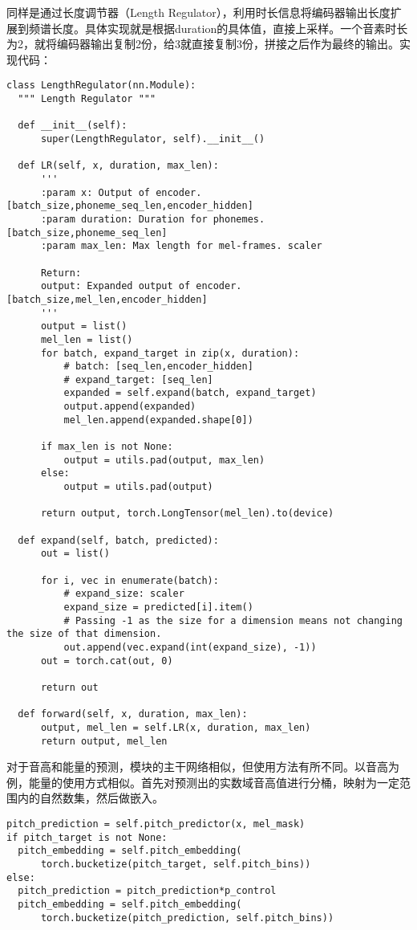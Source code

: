\documentclass[cn,10pt,math=newtx,citestyle=gb7714-2015,bibstyle=gb7714-2015]{elegantbook}
\begin{document}
同样是通过长度调节器（Length Regulator），利用时长信息将编码器输出长度扩展到频谱长度。具体实现就是根据duration的具体值，直接上采样。一个音素时长为2，就将编码器输出复制2份，给3就直接复制3份，拼接之后作为最终的输出。实现代码：

\begin{lstlisting}
class LengthRegulator(nn.Module):
  """ Length Regulator """

  def __init__(self):
      super(LengthRegulator, self).__init__()

  def LR(self, x, duration, max_len):
      '''
      :param x: Output of encoder. [batch_size,phoneme_seq_len,encoder_hidden]
      :param duration: Duration for phonemes. [batch_size,phoneme_seq_len]
      :param max_len: Max length for mel-frames. scaler

      Return:
      output: Expanded output of encoder. [batch_size,mel_len,encoder_hidden]
      '''
      output = list()
      mel_len = list()
      for batch, expand_target in zip(x, duration):
          # batch: [seq_len,encoder_hidden]
          # expand_target: [seq_len]
          expanded = self.expand(batch, expand_target)
          output.append(expanded)
          mel_len.append(expanded.shape[0])

      if max_len is not None:
          output = utils.pad(output, max_len)
      else:
          output = utils.pad(output)

      return output, torch.LongTensor(mel_len).to(device)

  def expand(self, batch, predicted):
      out = list()

      for i, vec in enumerate(batch):
          # expand_size: scaler
          expand_size = predicted[i].item()
          # Passing -1 as the size for a dimension means not changing the size of that dimension.
          out.append(vec.expand(int(expand_size), -1))
      out = torch.cat(out, 0)

      return out

  def forward(self, x, duration, max_len):
      output, mel_len = self.LR(x, duration, max_len)
      return output, mel_len
\end{lstlisting}

对于音高和能量的预测，模块的主干网络相似，但使用方法有所不同。以音高为例，能量的使用方式相似。首先对预测出的实数域音高值进行分桶，映射为一定范围内的自然数集，然后做嵌入。

\begin{lstlisting}
pitch_prediction = self.pitch_predictor(x, mel_mask)
if pitch_target is not None:
  pitch_embedding = self.pitch_embedding(
      torch.bucketize(pitch_target, self.pitch_bins))
else:
  pitch_prediction = pitch_prediction*p_control
  pitch_embedding = self.pitch_embedding(
      torch.bucketize(pitch_prediction, self.pitch_bins))
\end{lstlisting}
\end{document}
